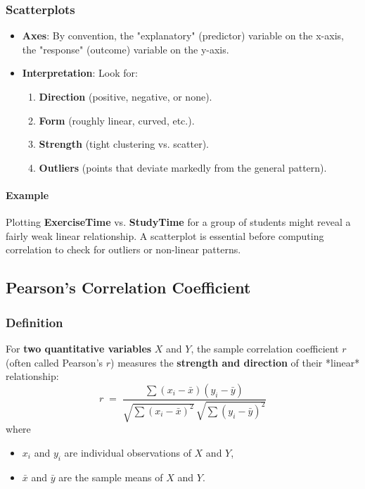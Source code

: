 \documentclass[10pt]{extarticle}
\begin{document}
\subsubsection*{Scatterplots}

\begin{itemize}
    \item \textbf{Axes}: By convention, the "explanatory" (predictor) variable on the x-axis, the "response" (outcome) variable on the y-axis.
    \item \textbf{Interpretation}: Look for:
          \begin{enumerate}
              \item \textbf{Direction} (positive, negative, or none).
              \item \textbf{Form} (roughly linear, curved, etc.).
              \item \textbf{Strength} (tight clustering vs. scatter).
              \item \textbf{Outliers} (points that deviate markedly from the general pattern).
          \end{enumerate}
\end{itemize}

\paragraph{Example} Plotting \textbf{ExerciseTime} vs. \textbf{StudyTime} for a group of students might reveal a fairly weak linear relationship. A scatterplot is essential before computing correlation to check for outliers or non-linear patterns.


\subsection{Pearson's Correlation Coefficient}

\subsubsection{Definition}

For \textbf{two quantitative variables} $X$ and $Y$, the sample correlation coefficient $r$ (often called Pearson's $r$) measures the \textbf{strength and direction} of their *linear* relationship:
\[
    r \;=\; \frac{\sum (x_i - \bar{x})(y_i - \bar{y})}
    {\sqrt{\sum (x_i - \bar{x})^2}\,\sqrt{\sum (y_i - \bar{y})^2}}
\]
where
\begin{itemize}
    \item $x_i$ and $y_i$ are individual observations of $X$ and $Y$,
    \item $\bar{x}$ and $\bar{y}$ are the sample means of $X$ and $Y$.
\end{itemize}
\end{document}
